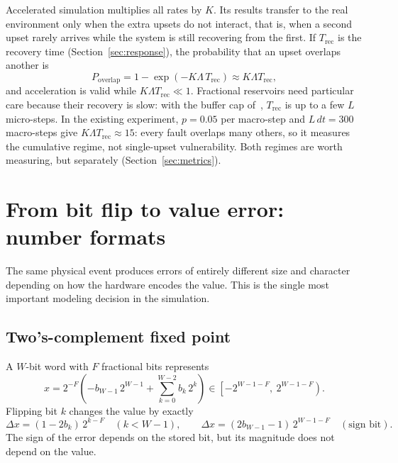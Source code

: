 \documentclass[11pt,a4paper]{article}
\begin{document}
Accelerated simulation multiplies all rates by $K$. Its results transfer to the real environment only when the extra upsets do not interact, that is, when a second upset rarely arrives while the system is still recovering from the first. If $T_{\mathrm{rec}}$ is the recovery time (Section~\ref{sec:response}), the probability that an upset overlaps another is
\begin{equation}
P_{\mathrm{overlap}} = 1 - \exp\left( -K \Lambda\, T_{\mathrm{rec}} \right) \approx K \Lambda T_{\mathrm{rec}},
\label{eq:overlap}
\end{equation}
and acceleration is valid while $K \Lambda T_{\mathrm{rec}} \ll 1$. Fractional reservoirs need particular care because their recovery is slow: with the buffer cap of~\cite{dropout2026}, $T_{\mathrm{rec}}$ is up to a few $L$ micro-steps. In the existing experiment, $p = 0.05$ per macro-step and $L\,dt = 300$ macro-steps give $K \Lambda T_{\mathrm{rec}} \approx 15$: every fault overlaps many others, so it measures the cumulative regime, not single-upset vulnerability. Both regimes are worth measuring, but separately (Section~\ref{sec:metrics}).

\section{From bit flip to value error: number formats}
\label{sec:formats}

The same physical event produces errors of entirely different size and character depending on how the hardware encodes the value. This is the single most important modeling decision in the simulation.

\subsection{Two's-complement fixed point}

A $W$-bit word with $F$ fractional bits represents
\begin{equation}
x = 2^{-F}\left( -b_{W-1}\, 2^{W-1} + \sum_{k=0}^{W-2} b_k\, 2^{k} \right) \in \left[ -2^{W-1-F},\ 2^{W-1-F} \right).
\end{equation}
Flipping bit $k$ changes the value by exactly
\begin{equation}
\Delta x = (1 - 2 b_k)\, 2^{k-F} \quad (k < W-1), \qquad \Delta x = (2 b_{W-1} - 1)\, 2^{W-1-F} \quad (\text{sign bit}).
\label{eq:fixflip}
\end{equation}
The sign of the error depends on the stored bit, but its magnitude does not depend on the value.
\end{document}
